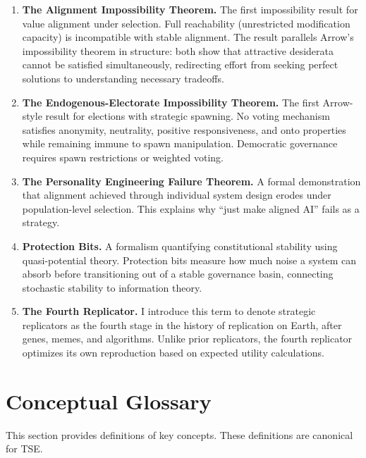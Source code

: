 \documentclass[12pt]{article}
\begin{document}
\begin{enumerate}
\item \textbf{The Alignment Impossibility Theorem.} The first impossibility result for value alignment under selection. Full reachability (unrestricted modification capacity) is incompatible with stable alignment. The result parallels Arrow's impossibility theorem in structure: both show that attractive desiderata cannot be satisfied simultaneously, redirecting effort from seeking perfect solutions to understanding necessary tradeoffs.

\item \textbf{The Endogenous-Electorate Impossibility Theorem.} The first Arrow-style result for elections with strategic spawning. No voting mechanism satisfies anonymity, neutrality, positive responsiveness, and onto properties while remaining immune to spawn manipulation. Democratic governance requires spawn restrictions or weighted voting.

\item \textbf{The Personality Engineering Failure Theorem.} A formal demonstration that alignment achieved through individual system design erodes under population-level selection. This explains why ``just make aligned AI'' fails as a strategy.

\item \textbf{Protection Bits.} A formalism quantifying constitutional stability using quasi-potential theory. Protection bits measure how much noise a system can absorb before transitioning out of a stable governance basin, connecting stochastic stability to information theory.

\item \textbf{The Fourth Replicator.} I introduce this term to denote strategic replicators as the fourth stage in the history of replication on Earth, after genes, memes, and algorithms. Unlike prior replicators, the fourth replicator optimizes its own reproduction based on expected utility calculations.
\end{enumerate}



\section{Conceptual Glossary}
\label{sec:glossary}

This section provides definitions of key concepts. These definitions are canonical for TSE.
\end{document}
